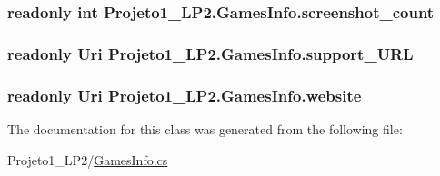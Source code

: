 \subsubsection[{\texorpdfstring{screenshot\+\_\+count}{screenshot_count}}]{\setlength{\rightskip}{0pt plus 5cm}readonly int Projeto1\+\_\+\+L\+P2.\+Games\+Info.\+screenshot\+\_\+count}\hypertarget{class_projeto1___l_p2_1_1_games_info_ad0145cfa3e657b97e9a6ee76fafdace5}{}\label{class_projeto1___l_p2_1_1_games_info_ad0145cfa3e657b97e9a6ee76fafdace5}
\subsubsection[{\texorpdfstring{support\+\_\+\+U\+RL}{support_URL}}]{\setlength{\rightskip}{0pt plus 5cm}readonly Uri Projeto1\+\_\+\+L\+P2.\+Games\+Info.\+support\+\_\+\+U\+RL}\hypertarget{class_projeto1___l_p2_1_1_games_info_a17141afd9cb89f5ef6147806e3b7cde3}{}\label{class_projeto1___l_p2_1_1_games_info_a17141afd9cb89f5ef6147806e3b7cde3}
\subsubsection[{\texorpdfstring{website}{website}}]{\setlength{\rightskip}{0pt plus 5cm}readonly Uri Projeto1\+\_\+\+L\+P2.\+Games\+Info.\+website}\hypertarget{class_projeto1___l_p2_1_1_games_info_aa6d0b49025d5cbef7f5cf37f5a730c1d}{}\label{class_projeto1___l_p2_1_1_games_info_aa6d0b49025d5cbef7f5cf37f5a730c1d}


The documentation for this class was generated from the following file\+:\begin{DoxyCompactItemize}
\item 
Projeto1\+\_\+\+L\+P2/\hyperlink{_games_info_8cs}{Games\+Info.\+cs}\end{DoxyCompactItemize}
